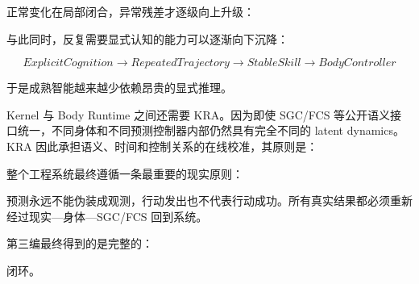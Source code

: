 正常变化在局部闭合，异常残差才逐级向上升级：

\begin{statementbox}
\centering
{}
\end{statementbox}

与此同时，反复需要显式认知的能力可以逐渐向下沉降：

$$
ExplicitCognition
\rightarrow
RepeatedTrajectory
\rightarrow
StableSkill
\rightarrow
BodyController
$$

于是成熟智能越来越少依赖昂贵的显式推理。

Kernel 与 Body Runtime 之间还需要 KRA。因为即使 SGC/FCS 等公开语义接口统一，不同身体和不同预测控制器内部仍然具有完全不同的 latent dynamics。KRA 因此承担语义、时间和控制关系的在线校准，其原则是：

\begin{statementbox}
\centering
{}
\end{statementbox}

整个工程系统最终遵循一条最重要的现实原则：

\begin{statementbox}
\centering
{}
\end{statementbox}

预测永远不能伪装成观测，行动发出也不代表行动成功。所有真实结果都必须重新经过现实—身体—SGC/FCS 回到系统。

第三编最终得到的是完整的：

\begin{statementbox}
\centering
{}
\end{statementbox}

闭环。






























